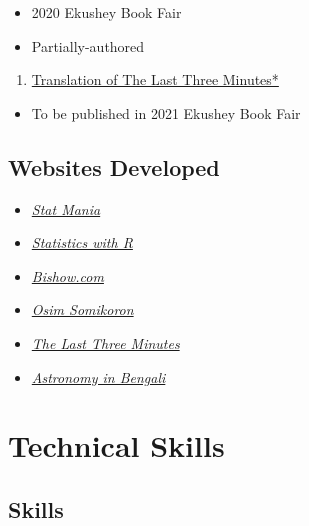 \documentclass[
]{book}
\providecommand{\tightlist}{%
  \setlength{\itemsep}{0pt}\setlength{\parskip}{0pt}}
\begin{document}
\begin{itemize}
\tightlist
\item
  2020 Ekushey Book Fair
\item
  Partially-authored
\end{itemize}

\begin{enumerate}
\def\labelenumi{\arabic{enumi}.}
\setcounter{enumi}{4}
\tightlist
\item
  \href{https://l3m.bishwo.com/}{Translation of The Last Three Minutes*}
\end{enumerate}

\begin{itemize}
\tightlist
\item
  To be published in 2021 Ekushey Book Fair
\end{itemize}

\hypertarget{websites-developed}{%
\subsection*{Websites Developed}\label{websites-developed}}

\begin{itemize}
\tightlist
\item
  \href{https://www.statmania.info}{\emph{Stat Mania}}
\item
  \href{https://rstat.statmania.info}{\emph{Statistics with R}}
\item
  \href{https://www.bishwo.com}{\emph{Bishow.com}}
\item
  \href{https://os.statmania.info}{\emph{Osim Somikoron}}
\item
  \href{https://l3m.bishwo.com/}{\emph{The Last Three Minutes}}
\item
  \href{https://sky.bishwo.com}{\emph{Astronomy in Bengali}}
\end{itemize}

\hypertarget{technical-skills}{%
\section*{Technical Skills}\label{technical-skills}}

\hypertarget{skills}{%
\subsection*{Skills}\label{skills}}
\end{document}
